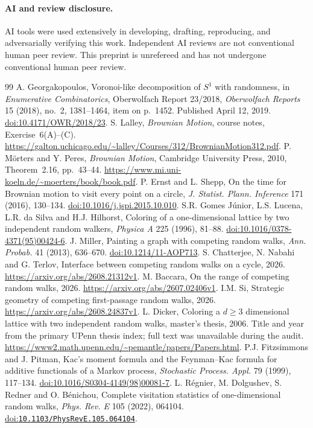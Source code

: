 \documentclass[11pt]{article}
\begin{document}
\paragraph{AI and review disclosure.}
AI tools were used extensively in developing, drafting, reproducing,
and adversarially verifying this work. Independent AI reviews are not
conventional human peer review. This preprint is unrefereed and has not
undergone conventional human peer review.

\begin{thebibliography}{99}
A. Georgakopoulos, Voronoi-like decomposition of $S^1$ with randomness,
in \emph{Enumerative Combinatorics}, Oberwolfach Report 23/2018,
\emph{Oberwolfach Reports} 15 (2018), no.~2, 1381--1464, item on p.~1452.
Published April 12, 2019. \href{https://doi.org/10.4171/OWR/2018/23}{doi:10.4171/OWR/2018/23}.
S. Lalley, \emph{Brownian Motion}, course notes, Exercise~6(A)--(C).
\url{https://galton.uchicago.edu/~lalley/Courses/312/BrownianMotion312.pdf}.
P. M\"orters and Y. Peres, \emph{Brownian Motion}, Cambridge University
Press, 2010, Theorem~2.16, pp.~43--44.
\url{https://www.mi.uni-koeln.de/~moerters/book/book.pdf}.
P. Ernst and L. Shepp, On the time for Brownian motion to visit every
point on a circle, \emph{J. Statist. Plann. Inference} 171 (2016), 130--134.
\href{https://doi.org/10.1016/j.jspi.2015.10.010}{doi:10.1016/j.jspi.2015.10.010}.
S.R. Gomes J\'unior, L.S. Lucena, L.R. da Silva and H.J. Hilhorst,
Coloring of a one-dimensional lattice by two independent random walkers,
\emph{Physica A} 225 (1996), 81--88.
\href{https://doi.org/10.1016/0378-4371(95)00424-6}{doi:10.1016/0378-4371(95)00424-6}.
J. Miller, Painting a graph with competing random walks,
\emph{Ann. Probab.} 41 (2013), 636--670.
\href{https://doi.org/10.1214/11-AOP713}{doi:10.1214/11-AOP713}.
S. Chatterjee, N. Nabahi and G. Terlov, Interface between competing
random walks on a cycle, 2026. \url{https://arxiv.org/abs/2608.21312v1}.
M. Baccara, On the range of competing random walks, 2026.
\url{https://arxiv.org/abs/2607.02406v1}.
I.M. Si, Strategic geometry of competing first-passage random walks, 2026.
\url{https://arxiv.org/abs/2608.24837v1}.
L. Dicker, Coloring a $d\geq3$ dimensional lattice with two independent
random walks, master's thesis, 2006. Title and year from the primary
UPenn thesis index; full text was unavailable during the audit.
\url{https://www2.math.upenn.edu/~pemantle/papers/Papers.html}.
P.J. Fitzsimmons and J. Pitman, Kac's moment formula and the Feynman--Kac
formula for additive functionals of a Markov process,
\emph{Stochastic Process. Appl.} 79 (1999), 117--134.
\href{https://doi.org/10.1016/S0304-4149(98)00081-7}{doi:10.1016/S0304-4149(98)00081-7}.
L. R\'egnier, M. Dolgushev, S. Redner and O. B\'enichou,
Complete visitation statistics of one-dimensional random walks,
\emph{Phys. Rev. E} 105 (2022), 064104.
\href{https://doi.org/10.1103/PhysRevE.105.064104}{doi:\nolinkurl{10.1103/PhysRevE.105.064104}}.
\end{thebibliography}
\end{document}
